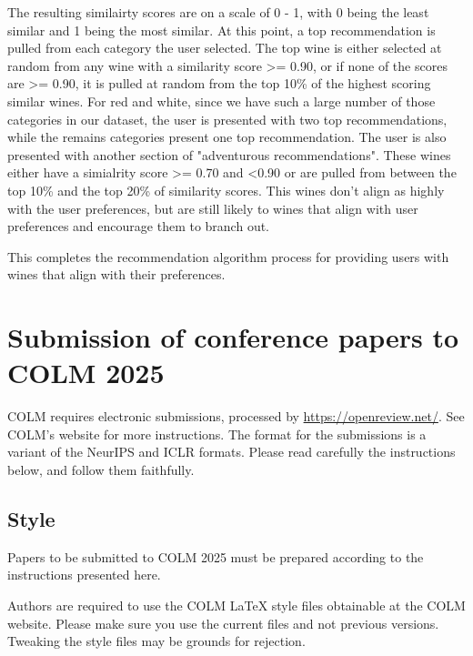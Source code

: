\documentclass{article} %
\begin{document}
The resulting similairty scores are on a scale of 0 - 1, with 0 being the least similar and 1 being the most similar. At this point, a top recommendation is pulled from each category the user selected. The top wine is either selected at random from any wine with a similarity score >= 0.90, or if none of the scores are >= 0.90, it is pulled at random from the top 10\% of the highest scoring similar wines. For red and white, since we have such a large number of those categories in our dataset, the user is presented with two top recommendations, while the remains categories present one top recommendation. The user is also presented with another section of "adventurous recommendations". These wines either have a simialrity score >= 0.70 and <0.90 or are pulled from between the top 10\% and the top 20\% of similarity scores. This wines don't align as highly with the user preferences, but are still likely to wines that align with user preferences and encourage them to branch out. 

This completes the recommendation algorithm process for providing users with wines that align with their preferences.

\section{Submission of conference papers to COLM 2025}

COLM requires electronic submissions, processed by
\url{https://openreview.net/}. See COLM's website for more instructions.
The format for the submissions is a variant of the NeurIPS and ICLR formats.
Please read carefully the instructions below, and follow them
faithfully.


\subsection{Style}

Papers to be submitted to COLM 2025 must be prepared according to the
instructions presented here.


Authors are required to use the COLM \LaTeX{} style files obtainable at the
COLM website. Please make sure you use the current files and
not previous versions. Tweaking the style files may be grounds for rejection.
\end{document}
